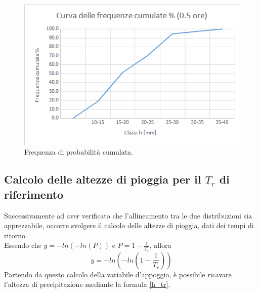 \begin{figure}[H]\centering
    \includegraphics[scale=.6]{immagini/freq_piogg_cum_05ore.png}
    \caption{Frequenza di probabilità cumulata.}
  \label{freq_cum_piogg_05ore}
\end{figure}

\subsection{Calcolo delle altezze di pioggia per il $T_r$ di riferimento}
Successivamente ad aver verificato che l'allineamento tra le due distribuzioni sia apprezzabile, occorre svolgere il calcolo delle altezze di pioggia, dati dei tempi di ritorno.\\
Essendo che $y = -ln(-ln(P))$ e $P = 1-\frac{1}{T_r}$, allora 
\begin{equation}
y = -ln\left(-ln\left(1-\frac{1}{T_r}\right)\right)
\end{equation}
Partendo da questo calcolo della variabile d'appoggio, è possibile ricavare l'altezza di precipitazione mediante la formula \ref{h_tr}.

